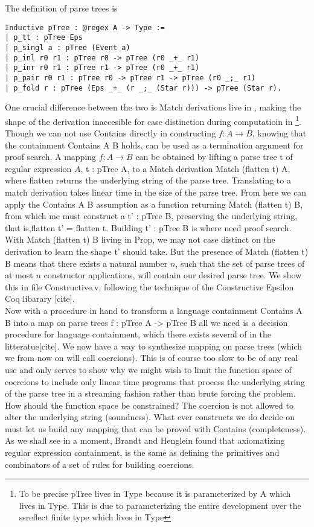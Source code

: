 \documentclass[a4paper,UKenglish,cleveref, autoref, thm-restate]{lipics-v2021}
\begin{document}
The definition of parse trees is
\begin{verbatim}
Inductive pTree : @regex A -> Type := 
| p_tt : pTree Eps 
| p_singl a : pTree (Event a)
| p_inl r0 r1 : pTree r0 -> pTree (r0 _+_ r1) 
| p_inr r0 r1 : pTree r1 -> pTree (r0 _+_ r1) 
| p_pair r0 r1 : pTree r0 -> pTree r1 -> pTree (r0 _;_ r1)
| p_fold r : pTree (Eps _+_ (r _;_ (Star r))) -> pTree (Star r).
\end{verbatim}
One crucial difference between the two is \textsf{Match} derivations live in \prop, making the shape of the derivation inaccesible for case distinction during computatioin in \myset \footnote{To be precise pTree lives in Type because it is parameterized by A which lives in Type. This is due to parameterizing the entire development over the ssreflect finite type which lives in Type }. Though we can not use \textsf{Contains} directly in constructing $f : A \rightarrow B$, knowing that the containment \textsf{Contains A B} holds, can be used as a termination argument for proof search. A mapping $f : A \rightarrow B$ can be obtained by lifting a parse tree \textsf{t} of regular expression $A$, \textsf{t : pTree A}, to a Match derivation \textsf{Match (flatten t) A}, where \textsf{flatten} returns the underlying string of the parse tree. Translating to a match derivation takes linear time in the size of the parse tree. From here we can apply the \textsf{Contains A B} assumption as a function returning \textsf{Match (flatten t) B}, from which me must construct a \textsf{t' : pTree B}, preserving the underlying string, that is,\textsf{flatten t' = flatten t}. Building \textsf{t' : pTree B} is where need proof search. With \textsf{Match (flatten t) B} living in Prop, we may not case distinct on the derivation to learn the shape \textsf{t'} should take. But the presence of \textsf{Match (flatten t) B} means that there exists a natural number $n$, such that the set of parse trees of at most $n$ constructor applications, will contain our desired parse tree. We show this in file \textsf{Constructive.v}, following the technique of the Constructive Epsilon Coq libarary [cite].\\
Now with a procedure in hand to transform a language containment \textsf{Contains A B} into a map on parse trees \textsf{f : pTree A -> pTree B} all we need is a decision procedure for language containment, which there exists several of in the litteratue[cite]. We now have a way to synthesize mapping on parse trees (which we from now on will call coercions). This is of course too slow to be of any real use and only serves to show why we might wish to limit the function space of coercions to include only linear time programs that process the underlying string of the parse tree in a streaming fashion rather than brute forcing the problem. How should the function space be constrained? The coercion is not allowed to alter the underlying string (soundness). What ever constructs we do decide on must let us build any mapping that can be proved with \textsf{Contains} (completeness). As we shall see in a moment, Brandt and Henglein found that axiomatizing regular expression containment, is the same as defining the primitives and combinators of a set of rules for building coercions.
\end{document}
